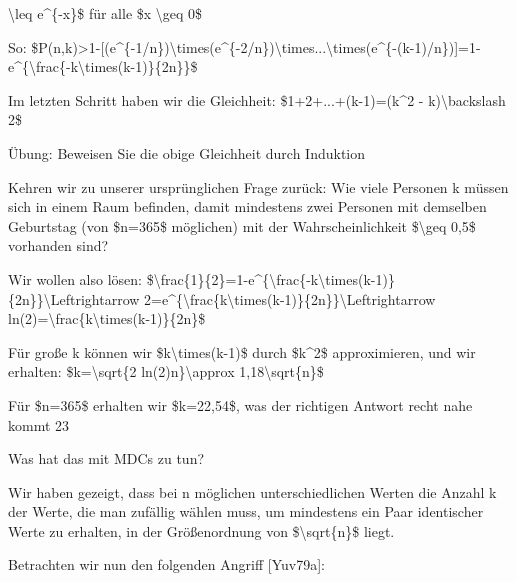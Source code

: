 \documentclass[a4paper]{article}
\begin{document}
\begin{multicols}{3}
\begin{itemize*}
            \textbackslash leq e\^{}\{-x\}\$ für alle \$x \textbackslash geq 0\$
            \item So:
            \$P(n,k)\textgreater1-{[}(e\^{}\{-1/n\})\textbackslash times(e\^{}\{-2/n\})\textbackslash times...\textbackslash times(e\^{}\{-(k-1)/n\}){]}=1-e\^{}\{\textbackslash frac\{-k\textbackslash times(k-1)\}\{2n\}\}\$
            \item Im letzten Schritt haben wir die Gleichheit: \$1+2+...+(k-1)=(k\^{}2 -
            k)\textbackslash backslash 2\$
            \begin{itemize*}
                  \item Übung: Beweisen Sie die obige Gleichheit durch Induktion
            \end{itemize*}
            \item Kehren wir zu unserer ursprünglichen Frage zurück: Wie viele Personen
            k müssen sich in einem Raum befinden, damit mindestens zwei Personen
            mit demselben Geburtstag (von \$n=365\$ möglichen) mit der
            Wahrscheinlichkeit \$\textbackslash geq 0,5\$ vorhanden sind?
            \begin{itemize*}
                  \item Wir wollen also lösen: \$\textbackslash frac\{1\}\{2\}=1-e\^{}\{\textbackslash frac\{-k\textbackslash times(k-1)\}\{2n\}\}\textbackslash Leftrightarrow 2=e\^{}\{\textbackslash frac\{k\textbackslash times(k-1)\}\{2n\}\}\textbackslash Leftrightarrow ln(2)=\textbackslash frac\{k\textbackslash times(k-1)\}\{2n\}\$
                  \item Für große k können wir \$k\textbackslash times(k-1)\$ durch \$k\^{}2\$ approximieren, und wir erhalten: \$k=\textbackslash sqrt\{2 ln(2)n\}\textbackslash approx 1,18\textbackslash sqrt\{n\}\$
                  \item Für \$n=365\$ erhalten wir \$k=22,54\$, was der richtigen Antwort recht nahe kommt 23
            \end{itemize*}
            \item Was hat das mit MDCs zu tun?
            \item Wir haben gezeigt, dass bei n möglichen unterschiedlichen Werten die
            Anzahl k der Werte, die man zufällig wählen muss, um mindestens ein
            Paar identischer Werte zu erhalten, in der Größenordnung von
            \$\textbackslash sqrt\{n\}\$ liegt.
            \item Betrachten wir nun den folgenden Angriff {[}Yuv79a{]}:
            \begin{itemize*}

\end{itemize*}
\end{itemize*}
\end{multicols}
\end{document}

